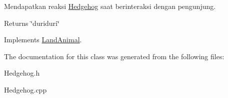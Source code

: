 Mendapatkan reaksi \hyperlink{classHedgehog}{Hedgehog} saat berinteraksi dengan pengunjung. 

\begin{DoxyReturn}{Returns}
\char`\"{}duriduri\char`\"{} 
\end{DoxyReturn}


Implements \hyperlink{classLandAnimal}{Land\-Animal}.



The documentation for this class was generated from the following files\-:\begin{DoxyCompactItemize}
\item 
Hedgehog.\-h\item 
Hedgehog.\-cpp\end{DoxyCompactItemize}
